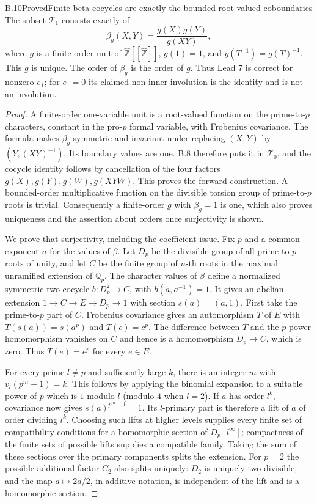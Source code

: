 \begin{statement}{B.10}{Proved}{Finite beta cocycles are exactly the bounded root-valued coboundaries}
The subset $\mathcal T_1$ consists exactly of
\[
 \beta_g(X,Y)=\frac{g(X)g(Y)}{g(XY)},
\]
where $g$ is a finite-order unit of
$\widehat{\mathbb Z}[[\widehat{\mathbb Z}]]$,
$g(1)=1$, and $g(T^{-1})=g(T)^{-1}$. This $g$ is unique.
The order of $\beta_g$ is the order of $g$.
Thus Lead 7 is correct for nonzero $e_1$; for $e_1=0$ its claimed
non-inner involution is the identity and is not an involution.
\end{statement}
\begin{proof}
A finite-order one-variable unit is a root-valued function on the
prime-to-$p$ characters, constant in the pro-$p$ formal variable,
with Frobenius covariance. The formula makes $\beta_g$ symmetric
and invariant under replacing $(X,Y)$ by $(Y,(XY)^{-1})$.
Its boundary values are one. B.8 therefore puts it in $\mathcal T_0$,
and the cocycle identity follows by cancellation of the four
factors $g(X),g(Y),g(W),g(XYW)$. This proves the forward construction.
A bounded-order multiplicative function on the divisible torsion
group of prime-to-$p$ roots is trivial. Consequently a finite-order
$g$ with $\beta_g=1$ is one, which also proves uniqueness and the
assertion about orders once surjectivity is shown.

We prove that surjectivity, including the coefficient issue.
Fix $p$ and a common exponent $n$ for the values of $\beta$.
Let $D_p$ be the divisible group of all prime-to-$p$ roots of unity,
and let $C$ be the finite group of $n$-th roots in the maximal
unramified extension of $\mathbb Q_p$. The character values of
$\beta$ define a normalized symmetric two-cocycle $b:D_p^2\to C$,
with $b(a,a^{-1})=1$. It gives an abelian extension
$1\to C\to E\to D_p\to1$ with section $s(a)=(a,1)$.
First take the prime-to-$p$ part of $C$. Frobenius covariance gives
an automorphism $T$ of $E$ with $T(s(a))=s(a^p)$ and $T(c)=c^p$.
The difference between $T$ and the $p$-power homomorphism vanishes
on $C$ and hence is a homomorphism $D_p\to C$, which is zero.
Thus $T(e)=e^p$ for every $e\in E$.

For every prime $l\ne p$ and sufficiently large $k$, there is an
integer $m$ with $v_l(p^m-1)=k$. This follows by applying the
binomial expansion to a suitable power of $p$ which is $1$ modulo
$l$ (modulo $4$ when $l=2$). If $a$ has order $l^k$, covariance
now gives $s(a)^{p^m-1}=1$. Its $l$-primary part is therefore a
lift of $a$ of order dividing $l^k$. Choosing such lifts at higher
levels supplies every finite set of compatibility conditions for
a homomorphic section of $D_p[l^\infty]$; compactness of the finite
sets of possible lifts supplies a compatible family. Taking the
sum of these sections over the primary components splits the
extension. For $p=2$ the possible additional factor $C_2$ also
splits uniquely: $D_2$ is uniquely two-divisible, and the map
$a\mapsto 2\widetilde{a/2}$, in additive notation, is independent
of the lift and is a homomorphic section.


\end{proof}
